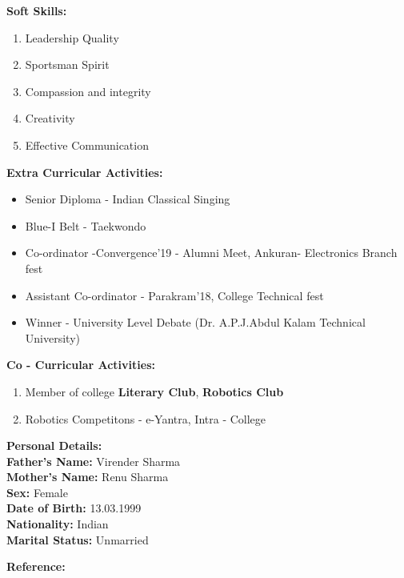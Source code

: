 \documentclass {article}
\begin{document}
\begin {flushleft} \Large \textbf{ Soft Skills:} \end{flushleft}
	\begin {enumerate}
		\item Leadership Quality
		\item Sportsman Spirit
		\item Compassion and integrity
		\item Creativity
		\item Effective Communication
	\end {enumerate}
\begin {flushleft} \Large \textbf{ Extra Curricular Activities:} \end{flushleft}
	\begin {itemize}
		\item Senior Diploma - Indian Classical Singing
		\item Blue-I Belt - Taekwondo
		\item Co-ordinator -Convergence'19 - Alumni Meet, Ankuran- Electronics Branch fest
		\item Assistant Co-ordinator - Parakram'18, College Technical fest 
		\item Winner - University Level Debate (Dr. A.P.J.Abdul Kalam Technical University)
	\end {itemize}
\begin {flushleft} \Large \textbf {Co - Curricular Activities:} \end{flushleft}
	\begin {enumerate}
		\item Member of college \textbf{Literary Club}, \textbf{Robotics Club}
		\item Robotics Competitons - e-Yantra, Intra - College		 
	\end {enumerate}
\begin {flushleft}  \Large \textbf {Personal Details: }\\ \large \textbf {Father's Name:} Virender Sharma\\ 
 \textbf {Mother's Name: }Renu Sharma \\ 
\textbf {Sex:} Female \\ 
\textbf {Date of Birth:} 13.03.1999\\ 
\textbf {Nationality:} Indian\\ 
\textbf {Marital Status:} Unmarried\\
\end {flushleft}
\newpage 
\begin {flushleft} \Large \textbf {Reference:}  \end{flushleft}
\end{document}
